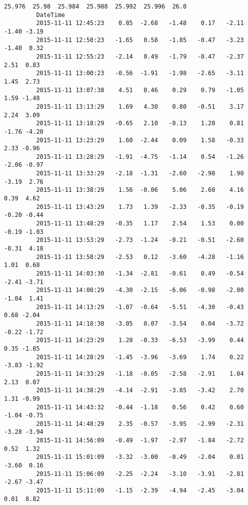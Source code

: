 \documentclass[a4paper,dvipdfmx]{jsarticle}
\begin{document}
\begin{Verbatim}[commandchars=\\\{\}]
                              25.976  25.98  25.984  25.988  25.992  25.996  26.0  
         DateTime                                                                  
         2015-11-11 12:45:23    0.85  -2.68   -1.48    0.17   -2.11   -1.40 -3.19  
         2015-11-11 12:50:23   -1.65   0.58   -1.85   -0.47   -3.23   -1.40  0.32  
         2015-11-11 12:55:23   -2.14   0.49   -1.79   -0.47   -2.37    2.51  0.83  
         2015-11-11 13:00:23   -0.56  -1.91   -1.98   -2.65   -3.11    1.45  2.73  
         2015-11-11 13:07:38    4.51   0.46    0.29    0.79   -1.05    1.59 -1.48  
         2015-11-11 13:13:29    1.69   4.30    0.80   -0.51    3.17    2.24  3.09  
         2015-11-11 13:18:29   -0.65   2.10   -0.13    1.20    0.81   -1.76 -4.20  
         2015-11-11 13:23:29    1.60  -2.44    0.09    1.58   -0.33    2.33 -0.96  
         2015-11-11 13:28:29   -1.91  -4.75   -1.14    0.54   -1.26   -2.06 -0.97  
         2015-11-11 13:33:29   -2.18  -1.31   -2.60   -2.98    1.90   -3.19  2.76  
         2015-11-11 13:38:29    1.56  -0.06    5.06    2.60    4.16    0.39  4.62  
         2015-11-11 13:43:29    1.73   1.39   -2.33   -0.35   -0.19   -0.20 -0.44  
         2015-11-11 13:48:29   -0.35   1.17    2.54    1.53    0.00   -0.19 -1.03  
         2015-11-11 13:53:29   -2.73  -1.24   -0.21   -0.51   -2.60   -0.31  4.18  
         2015-11-11 13:58:29   -2.53   0.12   -3.60   -4.28   -1.16    1.01  0.68  
         2015-11-11 14:03:30   -1.34  -2.81   -0.61    0.49   -0.54   -2.41 -3.71  
         2015-11-11 14:08:29   -4.30  -2.15   -6.06   -0.98   -2.00   -1.04  1.41  
         2015-11-11 14:13:29   -1.07  -0.64   -5.51   -4.30   -0.43    0.68 -2.04  
         2015-11-11 14:18:30   -3.05   0.07   -3.54    0.04   -3.72   -0.22 -1.72  
         2015-11-11 14:23:29    1.28  -0.33   -6.53   -3.99    0.44    0.35 -1.85  
         2015-11-11 14:28:29   -1.45  -3.96   -3.69    1.74    0.22   -3.83 -1.92  
         2015-11-11 14:33:29   -1.18  -0.05   -2.58   -2.91    1.04    2.13  0.07  
         2015-11-11 14:38:29   -4.14  -2.91   -3.85   -3.42    2.70    1.31 -0.99  
         2015-11-11 14:43:32   -0.44  -1.18    0.56    0.42    0.60   -1.04 -0.75  
         2015-11-11 14:48:29    2.35  -0.57   -3.95   -2.99   -2.31   -3.28 -3.94  
         2015-11-11 14:56:09   -0.49  -1.97   -2.97   -1.84   -2.72    0.52  1.32  
         2015-11-11 15:01:09   -3.32  -3.00   -0.49   -2.04    0.01   -3.60  0.16  
         2015-11-11 15:06:09   -2.25  -2.24   -3.10   -3.91   -2.81   -2.67 -3.47  
         2015-11-11 15:11:09   -1.15  -2.39   -4.94   -2.45   -3.04    0.01  8.82  

\end{Verbatim}
\end{document}
